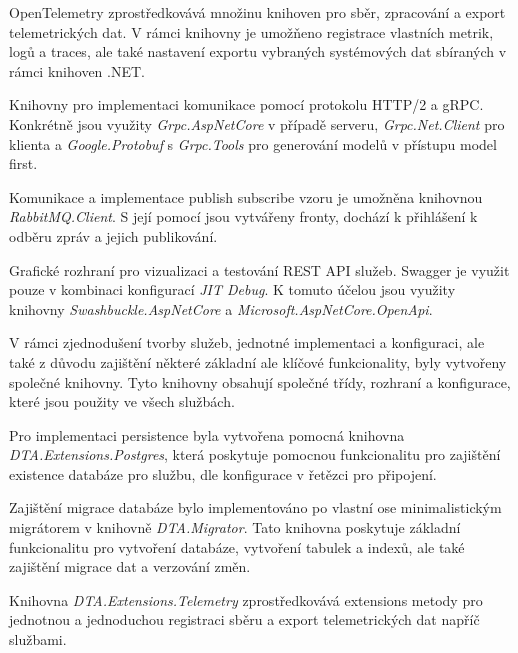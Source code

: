
OpenTelemetry zprostředkovává množinu knihoven pro sběr, zpracování a export telemetrických dat. V rámci knihovny je umožňeno registrace vlastních metrik, logů a traces, ale také nastavení exportu vybraných systémových dat sbíraných v rámci knihoven .NET.


Knihovny pro implementaci komunikace pomocí protokolu HTTP/2 a gRPC. Konkrétně jsou využity \emph{Grpc.AspNetCore} v případě serveru, \emph{Grpc.Net.Client} pro klienta a \emph{Google.Protobuf} s \emph{Grpc.Tools} pro generování modelů v přístupu model first.


Komunikace a implementace publish subscribe vzoru je umožněna knihovnou \emph{RabbitMQ.Client}. S její pomocí jsou vytvářeny fronty, dochází k přihlášení k odběru zpráv a jejich publikování.


Grafické rozhraní pro vizualizaci a testování REST API služeb. Swagger je využit pouze v kombinaci konfigurací \emph{JIT Debug}. K tomuto účelou jsou využity knihovny \emph{Swashbuckle.AspNetCore} a \emph{Microsoft.AspNetCore.OpenApi}.


V rámci zjednodušení tvorby služeb, jednotné implementaci a konfiguraci, ale také z důvodu zajištění některé základní ale klíčové funkcionality, byly vytvořeny společné knihovny. Tyto knihovny obsahují společné třídy, rozhraní a konfigurace, které jsou použity ve všech službách.


Pro implementaci persistence byla vytvořena pomocná knihovna \\ \emph{DTA.Extensions.Postgres}, která poskytuje pomocnou funkcionalitu pro zajištění existence databáze pro službu, dle konfigurace v řetězci pro připojení.


Zajištění migrace databáze bylo implementováno po vlastní ose minimalistickým migrátorem v knihovně \emph{DTA.Migrator}. Tato knihovna poskytuje základní funkcionalitu pro vytvoření databáze, vytvoření tabulek a indexů, ale také zajištění migrace dat a verzování změn.


Knihovna \emph{DTA.Extensions.Telemetry} zprostředkovává extensions metody pro jednotnou a jednoduchou registraci sběru a export telemetrických dat napříč službami.

